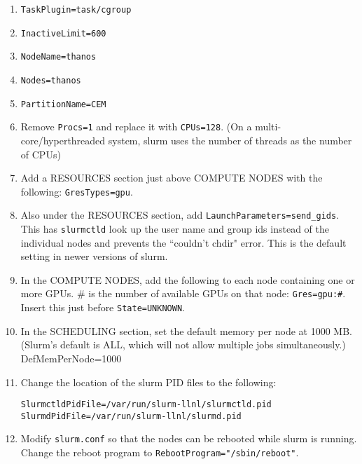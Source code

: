 \begin{enumerate}
\begin{enumerate}
\begin{enumerate}
		\item \texttt{TaskPlugin=task/cgroup}

		\item \texttt{InactiveLimit=600}	

		\item \texttt{NodeName=thanos}

		\item \texttt{Nodes=thanos}

		\item \texttt{PartitionName=CEM}

		\item Remove \texttt{Procs=1} and replace it with \texttt{CPUs=128}. (On a multi-core/hyperthreaded system, slurm uses the number of threads as the number of CPUs)

		\item Add a RESOURCES section just above COMPUTE NODES with the following: \texttt{GresTypes=gpu}.

		\item Also under the RESOURCES section, add \texttt{LaunchParameters=send\_gids}. This has \texttt{slurmctld} look up the user name and group ids instead of the individual nodes and prevents the ``couldn't chdir" error. This is the default setting in newer versions of slurm.

		\item In the COMPUTE NODES, add the following to each node containing one or more GPUs. \# is the number of available GPUs on that node: \texttt{Gres=gpu:\#}. Insert this just before \texttt{State=UNKNOWN}.

		\item In the SCHEDULING section, set the default memory per node at 1000 MB. (Slurm's default is ALL, which will not allow multiple jobs simultaneously.) \\
		DefMemPerNode=1000

		\item Change the location of the slurm PID files to the following:

		\texttt{SlurmctldPidFile=/var/run/slurm-llnl/slurmctld.pid} \\ %
		\texttt{SlurmdPidFile=/var/run/slurm-llnl/slurmd.pid} %

		\item Modify \texttt{slurm.conf} so that the nodes can be rebooted while slurm is running. Change the reboot program to \texttt{RebootProgram="/sbin/reboot"}. 


\end{enumerate}
\end{enumerate}
\end{enumerate}
